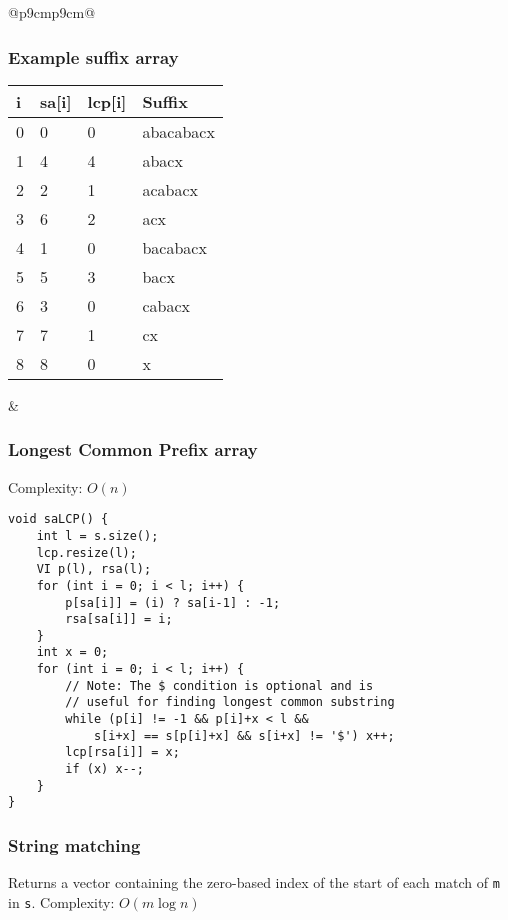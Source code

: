 \documentclass[letterpaper]{article}
\begin{document}
\begin{tabular}{@{}p{9cm}p{9cm}@{}}
    \subsubsection{Example suffix array}

    {
        \fontfamily{\ttdefault}\selectfont
        \begin{tabular}{llll}
            i & sa[i] & lcp[i] & Suffix    \\ \hline
            0 & 0     & 0      & abacabacx \\
            1 & 4     & 4      & abacx     \\
            2 & 2     & 1      & acabacx   \\
            3 & 6     & 2      & acx       \\
            4 & 1     & 0      & bacabacx  \\
            5 & 5     & 3      & bacx      \\
            6 & 3     & 0      & cabacx    \\
            7 & 7     & 1      & cx        \\
            8 & 8     & 0      & x         \\
        \end{tabular}
    }
     &
    \subsubsection{Longest Common Prefix array}

    Complexity: $O\left(n\right)$

    \begin{lstlisting}
void saLCP() {
	int l = s.size();
	lcp.resize(l);
	VI p(l), rsa(l);
	for (int i = 0; i < l; i++) {
		p[sa[i]] = (i) ? sa[i-1] : -1;
		rsa[sa[i]] = i;
	}
	int x = 0;
	for (int i = 0; i < l; i++) {
		// Note: The $ condition is optional and is
		// useful for finding longest common substring
		while (p[i] != -1 && p[i]+x < l &&
			s[i+x] == s[p[i]+x] && s[i+x] != '$') x++;
		lcp[rsa[i]] = x;
		if (x) x--;
	}
}
\end{lstlisting}

    \subsubsection{String matching}

    Returns a vector containing the zero-based index of the start of each match of \texttt{m} in \texttt{s}. Complexity: $O\left(m\log n\right)$


\end{tabular}
\end{document}
